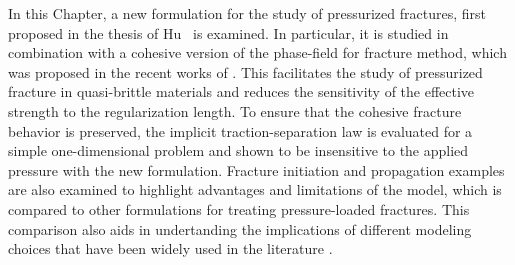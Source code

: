  
In this Chapter, a new formulation for the study of pressurized fractures, first proposed in the thesis of Hu~\cite{hu2021variationalthesis} is examined. In particular, it is studied in combination with a cohesive version of the phase-field for fracture method, which was proposed in the recent works of \cite{lorentz2011convergence, geelen2019phase, wu2017unified}.  This facilitates the study of pressurized fracture in quasi-brittle materials and reduces the sensitivity of the effective strength to the regularization length. To ensure that the cohesive fracture behavior is preserved, the implicit traction-separation law is evaluated for a simple one-dimensional problem and shown to be insensitive to the applied pressure with the new formulation. Fracture initiation and propagation examples are also examined to highlight advantages and limitations of the model, which is compared to other formulations for treating pressure-loaded fractures. This comparison also aids in undertanding the implications of different modeling choices that have been widely used in the literature \cite{bourdin2012variational, wheeler2014augmented, mikelic2015quasi, peco2017influence, jiang2022phase}.  

